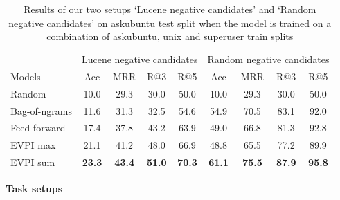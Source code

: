 \documentclass[11pt]{article}
\begin{document}


\begin{table}[t]
\small
\centering
\begin{tabular}{l|cccc|cccc}
\toprule
 & \multicolumn{4}{c|}{Lucene negative candidates} & \multicolumn{4}{c}{Random negative candidates} \\
Models & Acc & MRR & R@3 & R@5 & Acc & MRR & R@3 & R@5\\
\midrule
Random  & 10.0 & 29.3 & 30.0 & 50.0 &10.0 & 29.3 & 30.0 & 50.0 \\
Bag-of-ngrams & 11.6 & 31.3 & 32.5 & 54.6 & 54.9 & 70.5 & 83.1 & 92.0 \\
Feed-forward & 17.4 & 37.8 & 43.2 & 63.9 &  49.0 & 66.8 & 81.3 & 92.8 \\
EVPI max  & 21.1 & 41.2 & 48.0 & 66.9  & 48.8 & 65.5 & 77.2 & 89.9 \\
EVPI sum & \bf 23.3 & \bf 43.4 & \bf 51.0 & \bf 70.3 & \bf 61.1 & \bf 75.5 & \bf 87.9  & \bf 95.8  \\
\bottomrule
\end{tabular}
\label{results_topN}
\caption{Results of our two setups `Lucene negative candidates' and `Random negative candidates' on askubuntu test split when the model is trained on a combination of askubuntu, unix and superuser train splits}
\end{table}


\textbf{Task setups}\label{task_setup}\\\\
\end{document}
